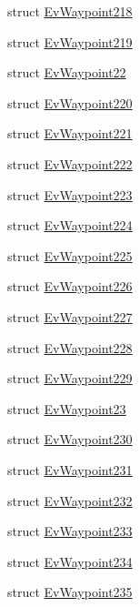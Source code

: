 \begin{DoxyCompactItemize}
\item 
struct \hyperlink{structmove__base__z__client_1_1EvWaypoint218}{Ev\+Waypoint218}
\item 
struct \hyperlink{structmove__base__z__client_1_1EvWaypoint219}{Ev\+Waypoint219}
\item 
struct \hyperlink{structmove__base__z__client_1_1EvWaypoint22}{Ev\+Waypoint22}
\item 
struct \hyperlink{structmove__base__z__client_1_1EvWaypoint220}{Ev\+Waypoint220}
\item 
struct \hyperlink{structmove__base__z__client_1_1EvWaypoint221}{Ev\+Waypoint221}
\item 
struct \hyperlink{structmove__base__z__client_1_1EvWaypoint222}{Ev\+Waypoint222}
\item 
struct \hyperlink{structmove__base__z__client_1_1EvWaypoint223}{Ev\+Waypoint223}
\item 
struct \hyperlink{structmove__base__z__client_1_1EvWaypoint224}{Ev\+Waypoint224}
\item 
struct \hyperlink{structmove__base__z__client_1_1EvWaypoint225}{Ev\+Waypoint225}
\item 
struct \hyperlink{structmove__base__z__client_1_1EvWaypoint226}{Ev\+Waypoint226}
\item 
struct \hyperlink{structmove__base__z__client_1_1EvWaypoint227}{Ev\+Waypoint227}
\item 
struct \hyperlink{structmove__base__z__client_1_1EvWaypoint228}{Ev\+Waypoint228}
\item 
struct \hyperlink{structmove__base__z__client_1_1EvWaypoint229}{Ev\+Waypoint229}
\item 
struct \hyperlink{structmove__base__z__client_1_1EvWaypoint23}{Ev\+Waypoint23}
\item 
struct \hyperlink{structmove__base__z__client_1_1EvWaypoint230}{Ev\+Waypoint230}
\item 
struct \hyperlink{structmove__base__z__client_1_1EvWaypoint231}{Ev\+Waypoint231}
\item 
struct \hyperlink{structmove__base__z__client_1_1EvWaypoint232}{Ev\+Waypoint232}
\item 
struct \hyperlink{structmove__base__z__client_1_1EvWaypoint233}{Ev\+Waypoint233}
\item 
struct \hyperlink{structmove__base__z__client_1_1EvWaypoint234}{Ev\+Waypoint234}
\item 
struct \hyperlink{structmove__base__z__client_1_1EvWaypoint235}{Ev\+Waypoint235}
\item 

\end{DoxyCompactItemize}

